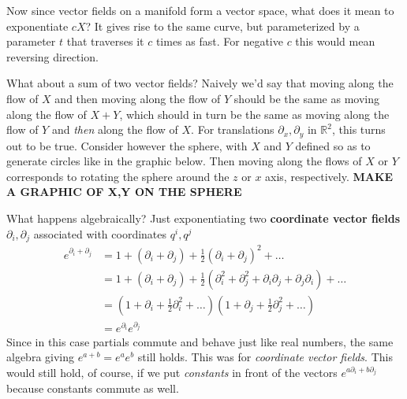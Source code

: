 		Now since vector fields on a manifold form a vector space, what does it mean to exponentiate $c X$? It gives rise to the same curve, but parameterized by a parameter $t$ that traverses it $c$ times as fast. For negative $c$ this would mean reversing direction. 
		
		What about a sum of two vector fields? Naively we'd say that moving along the flow of $X$ and then moving along the flow of $Y$ should be the same as moving along the flow of $X+Y$, which should in turn be the same as moving along the flow of $Y$ and \emph{then} along the flow of $X$. For translations $\partial_x, \partial_y$ in $\mathbb R^2$, this turns out to be true. Consider however the sphere, with $X$ and $Y$ defined so as to generate circles like in the graphic below. Then moving along the flows of $X$ or $Y$ corresponds to rotating the sphere around the $z$ or $x$ axis, respectively. 
		\textbf{MAKE A GRAPHIC OF X,Y ON THE SPHERE}
		
		What happens algebraically? Just exponentiating two \textbf{coordinate vector fields} $\partial_i, \partial_j$ associated with coordinates $q^i, q^j$
		\begin{align*}
			e^{\partial_i + \partial_j} &= 1 + (\partial_i + \partial_j) + \frac{1}{2}(\partial_i + \partial_j)^2 + \dots\\
			&= 1 + (\partial_i + \partial_j) + \frac{1}{2}(\partial_i^2 + \partial^2_j + \partial_i \partial_j + \partial_j \partial_i) + \dots\\
			&= (1+\partial_i + \frac{1}{2}\partial_i^2+\dots)(1+\partial_j + \frac{1}{2} \partial_j^2+\dots)\\
			&= e^{\partial_i} e^{\partial_j}
		\end{align*}
		Since in this case partials commute and behave just like real numbers, the same algebra giving $e^{a+b} = e^a e^b$ still holds. This was for \emph{coordinate vector fields}. This would still hold, of course, if we put \emph{constants} in front of the vectors $e^{a \partial_i + b \partial_j}$ because constants commute as well. 
		
